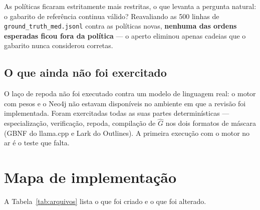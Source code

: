 \documentclass[11pt,a4paper]{article}
\begin{document}
As políticas ficaram estritamente mais restritas, o que levanta a pergunta
natural: o gabarito de referência continua válido? Reavaliando as 500 linhas de
\texttt{ground\_truth\_med.jsonl} contra as políticas novas,
\textbf{nenhuma das ordens esperadas ficou fora da política} --- o aperto
eliminou apenas cadeias que o gabarito nunca considerou corretas.

\subsection{O que ainda não foi exercitado}

O laço de repoda não foi executado contra um modelo de linguagem real: o motor
com pesos e o Neo4j não estavam disponíveis no ambiente em que a revisão foi
implementada. Foram exercitadas todas as suas partes determinísticas ---
especialização, verificação, repoda, compilação de $\hat{G}$ nos dois formatos
de máscara (GBNF do llama.cpp e Lark do Outlines). A primeira execução com o
motor no ar é o teste que falta.

\section{Mapa de implementação}

A Tabela~\ref{tab:arquivos} lista o que foi criado e o que foi alterado.
\end{document}
